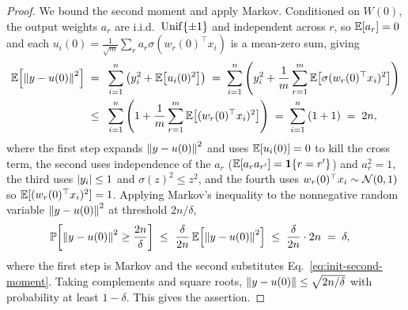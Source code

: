 \begin{proof}
We bound the second moment and apply Markov. Conditioned on $W(0)$, the output weights $a_r$
are i.i.d.\ $\mathrm{Unif}\{\pm1\}$ and independent across $r$, so $\mathbb{E}[a_r] = 0$ and each
$u_i(0) = \tfrac{1}{\sqrt m}\sum_r a_r \sigma(w_r(0)^\top x_i)$ is a mean-zero sum, giving
\begin{align}\label{eq:init-second-moment}
\mathbb{E}\!\left[ \left\| y - u(0) \right\|^2 \right]
\;=\; & ~ \sum_{i=1}^{n} \left( y_i^2 + \mathbb{E}\!\left[ u_i(0)^2 \right] \right)
\;=\; \sum_{i=1}^{n} \left( y_i^2 + \frac{1}{m}\sum_{r=1}^{m} \mathbb{E}\!\left[ \sigma(w_r(0)^\top x_i)^2 \right] \right) \\
\;\le\; & ~ \sum_{i=1}^{n} \left( 1 + \frac{1}{m}\sum_{r=1}^{m} \mathbb{E}\!\left[ (w_r(0)^\top x_i)^2 \right] \right)
\;=\; \sum_{i=1}^{n} \left( 1 + 1 \right)
\;=\; 2n,
\end{align}
where the first step expands $\left\| y - u(0) \right\|^2$ and uses $\mathbb{E}[u_i(0)] = 0$ to kill the cross
term, the second uses independence of the $a_r$ ($\mathbb{E}[a_r a_{r'}] = \mathbf{1}\!\left\{r = r'\right\}$) and
$a_r^2 = 1$, the third uses $\left| y_i \right| \le 1$ and $\sigma(z)^2 \le z^2$, and the fourth uses
$w_r(0)^\top x_i \sim \mathcal{N}(0,1)$ so $\mathbb{E}[(w_r(0)^\top x_i)^2] = 1$. Applying Markov's inequality to
the nonnegative random variable $\left\| y - u(0) \right\|^2$ at threshold $2n/\delta$,
\begin{align}\label{eq:init-markov}
\mathbb{P}\!\left[ \left\| y - u(0) \right\|^2 \ge \frac{2n}{\delta} \right]
\;\le\; & ~ \frac{\delta}{2n}\, \mathbb{E}\!\left[ \left\| y - u(0) \right\|^2 \right]
\;\le\; \frac{\delta}{2n} \cdot 2n
\;=\; \delta,
\end{align}
where the first step is Markov and the second substitutes Eq.~\eqref{eq:init-second-moment}.
Taking complements and square roots, $\left\| y - u(0) \right\| \le \sqrt{2n/\delta}$ with probability at
least $1 - \delta$. This gives the assertion.
\end{proof}
